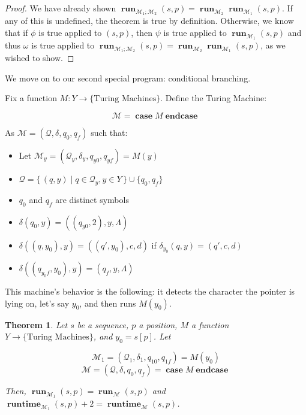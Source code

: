 \documentclass{article}
\newtheorem{theorem}{Theorem}
\newcommand{\M}{\mathcal{M}}
\newcommand{\Q}{\mathcal{Q}}
\DeclareMathOperator{\run}{\mathbf{run}}
\DeclareMathOperator{\runtime}{\mathbf{runtime}}
\DeclareMathOperator{\Ncase}{\mathbf{case}}
\DeclareMathOperator{\Nendcase}{\mathbf{endcase}}
\begin{document}
	\begin{proof}
	
	We have already shown $\run_{\M_1;\M_2} (s,p) = \run_{\M_2} \run_{\M_1} (s,p)$. If any of this is undefined, the theorem is true by definition. Otherwise, we know that if $\phi$ is true applied to $(s,p)$, then $\psi$ is true applied to $\run_{\M_1} (s,p)$ and thus $\omega$ is true applied to $\run_{\M_1;\M_2} (s,p) = \run_{\M_2} \run_{\M_1} (s,p)$, as we wished to show.
	\end{proof}
	
	We move on to our second special program: conditional branching.
	
	Fix a function $M : Y \rightarrow \{\text{Turing Machines}\}$. Define the Turing Machine:
	
	\[ \M = \Ncase M \Nendcase \]
	
	As $\M = (\Q, \delta, q_0, q_f)$ such that:
	
	\begin{itemize}
	\item Let $\M_y = (\Q_y, \delta_y, q_{y0}, q_{yf}) = M(y)$
	
	\item $\Q = \{\,(q, y) \mid q \in \Q_y, y \in Y\,\} \cup \{q_0, q_f\}$
	
	\item $q_0$ and $q_f$ are distinct symbols
	
	\item $\delta(q_0, y) = ((q_{y0}, 2), y, \Lambda)$
	
	\item $\delta((q, y_0), y) = ((q', y_0), c, d)$ if $\delta_{y_0}(q, y) = (q', c, d)$
	
	\item $\delta((q_{y_0 f}, y_0), y) = (q_f, y, \Lambda)$
	\end{itemize}
	
	This machine's behavior is the following: it detects the character the pointer is lying on, let's say $y_0$, and then runs $M(y_0)$.
	
	\begin{theorem}
	Let $s$ be a sequence, $p$ a position, $M$ a function $Y \rightarrow \{\text{Turing Machines}\}$, and $y_0 = s[p]$. Let
	
	
	\[\M_1 = (\Q_1, \delta_1, q_{10}, q_{1f}) = M(y_0)\]
	\[\M = (\Q, \delta, q_0, q_f) = \Ncase M \Nendcase \]
	
	Then, $\run_{\M_1} (s, p) = \run_\M(s,p)$ and $\runtime_{\M_1}(s,p) + 2 = \runtime_\M(s,p)$.
	\end{theorem}
	
\end{document}
